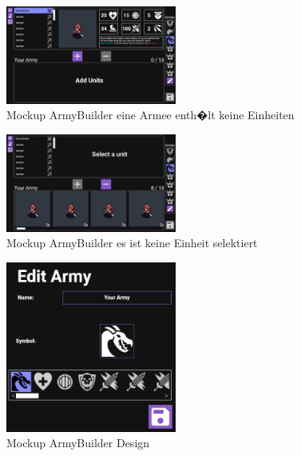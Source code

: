 \documentclass[12pt, titlepage]{scrartcl}
\begin{document}
		\begin{figure}[H] 
			\centering
			\includegraphics[width=0.5\textwidth]{Army_Builder_Add_Units.png}
			\caption{Mockup ArmyBuilder eine Armee enth�lt keine Einheiten}
			\label{ArmyBuilder_AddUnits}
		\end{figure}
		\begin{figure}[H] 
			\centering
			\includegraphics[width=0.5\textwidth]{ArmyBuilder_Select_Unit.png}
			\caption{Mockup ArmyBuilder es ist keine Einheit selektiert}
			\label{ArmyBuilder_Select_Unit}
		\end{figure}
		\begin{figure}[H] 
			\centering
			\includegraphics[width=0.5\textwidth]{ArmyEditor.png}
			\caption{Mockup ArmyBuilder Design}
			\label{AmryEditor}
		\end{figure}
		
\end{document}

